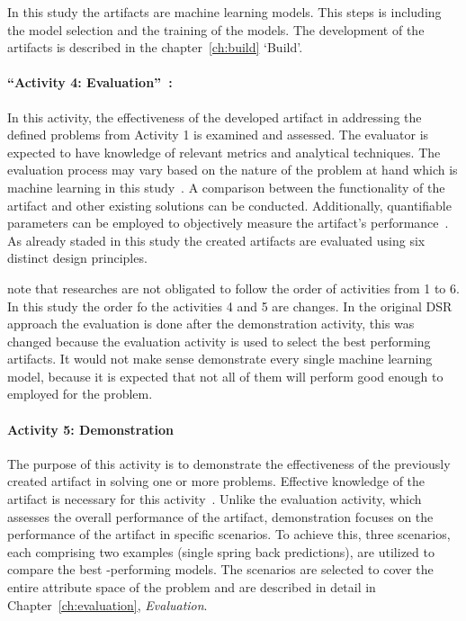 In this study the artifacts are machine learning models.
This steps is including the model selection and the training of the models.
The development of the artifacts is described in the chapter~\ref{ch:build} `Build'.

\paragraph{``Activity 4: Evaluation''~\cite[p. 56]{peffers_designscienceresearch_2007}:}
In this activity, the effectiveness of the developed artifact in addressing the defined problems from Activity 1 is
examined and assessed.
The evaluator is expected to have knowledge of relevant metrics and analytical techniques.
The evaluation process may vary based on the nature of the problem at hand which is machine learning in this
study~\cite[p. 56]{peffers_designscienceresearch_2007}.
A comparison between the functionality of the artifact and other existing solutions can be conducted.
Additionally, quantifiable parameters can be employed to objectively measure the artifact's
performance~\cite[p. 56]{peffers_designscienceresearch_2007}.
As already staded in this study the created artifacts are evaluated using six distinct design principles.


\cite{peffers_designscienceresearch_2007} note that researches are not obligated to follow the order of activities
from 1 to 6.
In this study the order fo the activities 4 and 5 are changes.
In the original DSR approach the evaluation is done after the demonstration activity, this was changed because the
evaluation activity is used to select the best performing artifacts.
It would not make sense demonstrate every single machine learning model, because it is expected that not all of them
will perform good enough to employed for the problem.

\paragraph{Activity 5: Demonstration}
The purpose of this activity is to demonstrate the effectiveness of the previously created artifact in solving one or
more problems.
Effective knowledge of the artifact is necessary for this
activity~\cite[p. 55]{peffers_designscienceresearch_2007}.
Unlike the evaluation activity, which assesses the overall performance of the artifact, demonstration focuses on the
performance of the artifact in specific scenarios.
To achieve this, three scenarios, each comprising two examples (single spring back predictions), are utilized to
compare the best -performing models.
The scenarios are selected to cover the entire attribute space of the problem and are described in detail in
Chapter~\ref{ch:evaluation}, \textit{Evaluation}.

